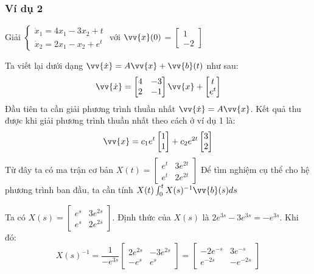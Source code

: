 \documentclass[a4paper]{article}
\begin{document}
\subsubsection{Ví dụ 2}
Giải 
$\begin{cases}
    \dot{x}_1 = 4x_1 - 3x_2 + t\\
    \dot{x}_2 = 2x_1 - x_2 + e^{t}
\end{cases}$ 
với 
$\vv{x}(0)$ = 
$
\begin{bmatrix}
    1 \\
    -2
\end{bmatrix}
$
\par
Ta viết lại dưới dạng $\vv{\dot{x}} = A \vv{x} + \vv{b}(t)$ như sau:
\begin{equation*}
    \vv{\dot{x}} = 
    \begin{bmatrix}
        4 & -3 \\
        2 & -1 
    \end{bmatrix}
    \vv{x} + 
    \begin{bmatrix}
        t \\
        e^t
    \end{bmatrix}
\end{equation*}
 Đầu tiên ta cần giải phương trình thuần nhất $\vv{\dot{x}} = A\vv{x}$. Kết quả thu được khi giải phương trình thuần nhất theo cách ở ví dụ 1 là: 
 \[
    \vv{x} = c_1e^t
    \begin{bmatrix}
        1 \\
        1
    \end{bmatrix}
    + c_2 e^{2t} 
    \begin{bmatrix}
        3 \\
        2
    \end{bmatrix}
 \]
Từ đây ta có ma trận cơ bản 
$
X(t) = 
\begin{bmatrix}
    e^t & 3e^{2t} \\
    e^t & 2e^{2t}
\end{bmatrix}
$ 
Để tìm nghiệm cụ thể cho hệ phương trình ban đầu, ta cần tính $X(t) \int_0^{t} X(s)^{-1}\vv{b}(s) ds $ \par
Ta có 
$
X(s) = 
\begin{bmatrix}
    e^s & 3e^{2s} \\
    e^s & 2e^{2s}
\end{bmatrix}
$. 
Định thức của $X(s)$ là $2e^{3s} - 3e^{3s} = -e^{3s}$. Khi đó:
\begin{equation*}
    X(s)^{-1} = \dfrac{1}{-e^{3s}} 
    \begin{bmatrix}
        2e^{2s}  & -3e^{2s} \\
        -e^s     & e^s
    \end{bmatrix}
    = 
    \begin{bmatrix}
        -2e^{-s}  & 3e^{-s} \\
        e^{-2s}  & -e^{-2s}
    \end{bmatrix}
\end{equation*}
\end{document}
